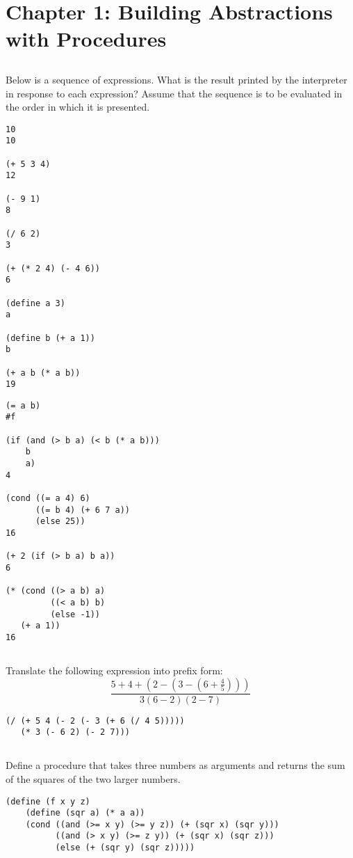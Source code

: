 \documentclass[fleqn]{article}
\begin{document}
\section{Chapter 1: Building Abstractions with Procedures}

\subsection{}
Below is a sequence of expressions. What is the result printed by the interpreter in response to each expression? Assume that the sequence is to be evaluated in the order in which it is presented.
\begin{multicols}{2}
\begin{lstlisting}
10
10

(+ 5 3 4)
12
    
(- 9 1)
8

(/ 6 2)
3

(+ (* 2 4) (- 4 6))
6

(define a 3)
a

(define b (+ a 1))
b

(+ a b (* a b))
19
\end{lstlisting}
\columnbreak
\begin{lstlisting}
(= a b)
#f

(if (and (> b a) (< b (* a b)))
    b
    a)
4

(cond ((= a 4) 6)
      ((= b 4) (+ 6 7 a))
      (else 25))
16

(+ 2 (if (> b a) b a))
6

(* (cond ((> a b) a)
         ((< a b) b)
         (else -1))
   (+ a 1))
16
\end{lstlisting}
\end{multicols}

\subsection{}
Translate the following expression into prefix form:\\
\[ \frac{5 + 4 + (2 - (3 - (6 + \frac{4}{5})))}{3(6 - 2)(2 - 7)} \]
\begin{lstlisting}
(/ (+ 5 4 (- 2 (- 3 (+ 6 (/ 4 5)))))
   (* 3 (- 6 2) (- 2 7)))
\end{lstlisting}

\subsection{}
Define a procedure that takes three numbers as arguments and returns the sum of the squares of the two larger numbers.
\begin{lstlisting}
(define (f x y z)
    (define (sqr a) (* a a))
    (cond ((and (>= x y) (>= y z)) (+ (sqr x) (sqr y)))
          ((and (> x y) (>= z y)) (+ (sqr x) (sqr z)))
          (else (+ (sqr y) (sqr z)))))
\end{lstlisting}
\end{document}
